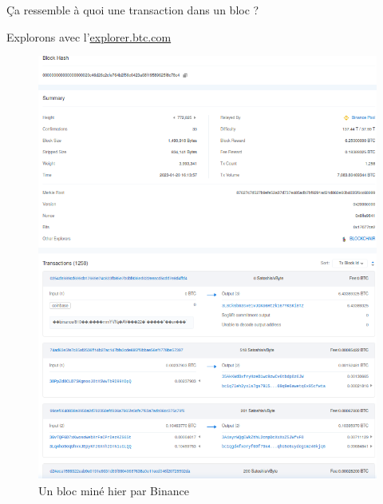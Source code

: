 \documentclass[presentation]{beamer}
\begin{document}
\begin{frame}[label={sec:org4a6cb3d}]{Ça ressemble à quoi une transaction dans un bloc ?}
\begin{block}{Explorons avec l'\href{https://explorer.btc.com/btc/block/772825}{explorer.btc.com}}
\begin{figure}[htbp]
\centering
\includegraphics[height=.8\textheight]{Images/binance_bloc.png}
\caption{Un bloc miné hier par Binance}
\end{figure}
\end{block}
\end{frame}
\end{document}
